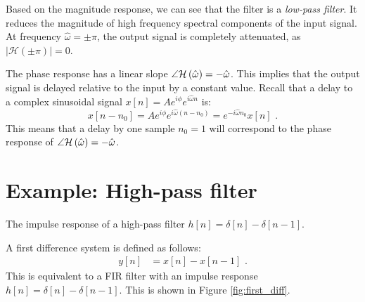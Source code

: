 Based on the magnitude response, we can see that the filter is
a \emph{low-pass filter}. It reduces the magnitude of high frequency
spectral components of the input signal. At frequency
$\hat{\omega}=\pm\pi$, the output signal is completely attenuated, as
$|\mathcal{H}(\pm \pi)|=0$.

The phase response has a linear slope $\angle \mathcal{H}\left(\hat{\omega}\right) =
    -\hat{\omega}$. This implies that the output signal is delayed
relative to the input by a constant value. Recall that a delay to a
complex sinusoidal signal $x[n]=A e^{i\phi} e^{i\hat{\omega}n} $ is:
\begin{equation}
    x[n-n_0] = A e^{i\phi} e^{i\hat{\omega} (n-n_0)} = e^{-i\hat{\omega}n_0}x[n] \,\,.
\end{equation}
This means that a delay by one sample $n_0=1$ will correspond to the phase
response of $\angle \mathcal{H}\left(\hat{\omega}\right) = -\hat{\omega}$.


\section{Example: High-pass filter}
\begin{marginfigure}
    \begin{center}
    \end{center}
    \caption{The impulse response of a high-pass filter $h[n]=\delta[n]-\delta[n-1]$.}
    \label{fig:first_diff}
\end{marginfigure}

A first difference system is defined as follows:
\begin{align}
    y[n] & = x[n] - x[n-1] \,\,.
\end{align}
This is equivalent to a FIR filter with an impulse response $h[n]=\delta[n]-\delta[n-1]$.
This is shown in Figure \ref{fig:first_diff}.

